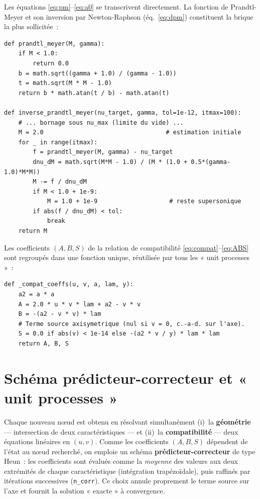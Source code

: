 \documentclass[11pt,a4paper]{article}
\begin{document}
Les équations \eqref{eq:pm}--\eqref{eq:a0} se transcrivent directement. La
fonction de Prandtl-Meyer et son inversion par Newton-Raphson
(éq.~\eqref{eq:dpm}) constituent la brique la plus sollicitée~:

\begin{lstlisting}[style=py,caption={Prandtl-Meyer et son inversion.}]
def prandtl_meyer(M, gamma):
    if M < 1.0:
        return 0.0
    b = math.sqrt((gamma + 1.0) / (gamma - 1.0))
    t = math.sqrt(M * M - 1.0)
    return b * math.atan(t / b) - math.atan(t)

def inverse_prandtl_meyer(nu_target, gamma, tol=1e-12, itmax=100):
    # ... bornage sous nu_max (limite du vide) ...
    M = 2.0                                  # estimation initiale
    for _ in range(itmax):
        f = prandtl_meyer(M, gamma) - nu_target
        dnu_dM = math.sqrt(M*M - 1.0) / (M * (1.0 + 0.5*(gamma-1.0)*M*M))
        M -= f / dnu_dM
        if M < 1.0 + 1e-9:
            M = 1.0 + 1e-9                    # reste supersonique
        if abs(f / dnu_dM) < tol:
            break
    return M
\end{lstlisting}

Les coefficients $(A,B,S)$ de la relation de compatibilité
\eqref{eq:compat}--\eqref{eq:ABS} sont regroupés dans une fonction unique,
réutilisée par tous les « unit processes »~:

\begin{lstlisting}[style=py,caption={Coefficients de compatibilité (éq.~\eqref{eq:ABS}).}]
def _compat_coeffs(u, v, a, lam, y):
    a2 = a * a
    A = 2.0 * u * v * lam + a2 - v * v
    B = -(a2 - v * v) * lam
    # Terme source axisymetrique (nul si v = 0, c.-a-d. sur l'axe).
    S = 0.0 if abs(v) < 1e-14 else -(a2 * v / y) * lam * lam
    return A, B, S
\end{lstlisting}

\section{Schéma prédicteur-correcteur et « unit processes »}

Chaque nouveau n\oe ud est obtenu en résolvant simultanément (i)~la
\textbf{géométrie} --- intersection de deux caractéristiques --- et (ii)~la
\textbf{compatibilité} --- deux équations linéaires en $(u,v)$. Comme les
coefficients $(A,B,S)$ dépendent de l'état au n\oe ud recherché, on emploie un
schéma \textbf{prédicteur-correcteur} de type Heun~: les coefficients sont
évalués comme la \emph{moyenne} des valeurs aux deux extrémités de chaque
caractéristique (intégration trapézoïdale), puis raffinés par itérations
successives (\texttt{n\_corr}). Ce choix annule proprement le terme source sur
l'axe et fournit la solution « exacte » à convergence.
\end{document}
